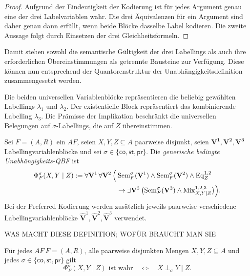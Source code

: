 \begin{proof}
    Aufgrund der Eindeutigkeit der Kodierung ist für jedes Argument genau eine der drei
    Labelvariablen wahr. Die drei Äquivalenzen für ein Argument sind daher
    genau dann erfüllt, wenn beide Blöcke dasselbe Label kodieren. Die zweite
    Aussage folgt durch Einsetzen der drei Gleichheitsformeln.
\end{proof}

Damit stehen sowohl die semantische Gültigkeit der drei Labellings als
auch ihre erforderlichen Übereinstimmungen als getrennte Bausteine zur
Verfügung. Diese können nun entsprechend der Quantorenstruktur der
Unabhängigkeitsdefinition zusammengesetzt werden.

Die beiden universellen Variablenblöcke repräsentieren die beliebig
gewählten Labellings \(\lambda_1\) und \(\lambda_2\). Der existentielle
Block repräsentiert das kombinierende Labelling \(\lambda_3\). Die
Prämisse der Implikation beschränkt die universellen Belegungen auf
\(\sigma\)-Labellings, die auf \(Z\) übereinstimmen.
\begin{Definition}
    \label{def:generic-independence-qbf}
    Sei \(F=(A,R)\) ein \(AF\), seien \(X,Y,Z\subseteq A\) paarweise disjunkt, seien \(\mathbf{V^1}, 
    \mathbf{V^2}, \mathbf{V^3}\) Labellingvariablenblöcke und sei
    \(\sigma\in\{\mathsf{co},\mathsf{st},\mathsf{pr}\}\). Die
    \emph{generische bedingte Unabhängigkeits-QBF} ist
    \[
    \begin{split}
        \Phi^\sigma_F(X,Y\mid Z)
        :=\forall\mathbf V^1\,\forall\mathbf V^2\,
        \Bigl(&
            \operatorname{Sem}^{\sigma}_F(\mathbf V^1)
            \land
            \operatorname{Sem}^{\sigma}_F(\mathbf V^2)
            \land
            \operatorname{Eq}^{1,2}_Z
        \\
        &\rightarrow
        \exists\mathbf V^3\,
        \bigl(
            \operatorname{Sem}^{\sigma}_F(\mathbf V^3)
            \land
            \operatorname{Mix}^{1,2,3}_{X,Y\mid Z}
        \bigr)
        \Bigr).
    \end{split}
    \]
    Bei der Preferred-Kodierung werden zusätzlich jeweils
    paarweise verschiedene Labellingvariablenblöcke
    \(\widehat{\mathbf V}^{1},
    \widehat{\mathbf V}^{2},
    \widehat{\mathbf V}^{3}\)
    verwendet.
\end{Definition}
WAS MACHT DIESE DEFINITION; WOFÜR BRAUCHT MAN SIE
\begin{Theorem}
    \label{thm:generic-independence-qbf-correct}
    Für jedes \(AF~F=(A,R)\), alle paarweise disjunkten Mengen
    \(X,Y,Z\subseteq A\) und jedes
    \(\sigma\in\{\mathsf{co},\mathsf{st},\mathsf{pr}\}\) gilt
    \[
        \Phi^\sigma_F(X,Y\mid Z)\text{ ist wahr}
        \quad\Longleftrightarrow\quad
        X\perp_\sigma Y\mid Z.
    \]
\end{Theorem}
